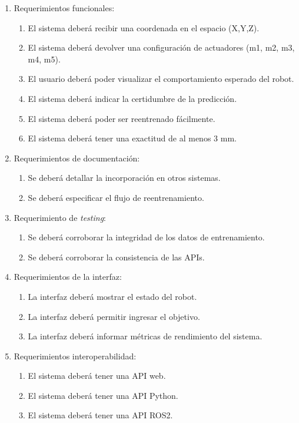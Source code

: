\documentclass[
11pt, %
]{charter}
\begin{document}
\begin{enumerate}
	\item Requerimientos funcionales:
		\begin{enumerate}
			\item El sistema deberá recibir una coordenada en el espacio (X,Y,Z).
			\item El sistema deberá devolver una configuración de actuadores (m1, m2, m3, m4, m5).
			\item El usuario deberá poder visualizar el comportamiento esperado del robot.
			\item El sistema deberá indicar la certidumbre de la predicción.
			\item El sistema deberá poder ser reentrenado fácilmente.
			\item El sistema deberá tener una exactitud de al menos 3 mm.
		\end{enumerate}
	\item Requerimientos de documentación:
		\begin{enumerate}
			\item Se deberá detallar la incorporación en otros sistemas.
			\item Se deberá especificar el flujo de reentrenamiento.
		\end{enumerate}
	\item Requerimiento de \textit{testing}:
		\begin{enumerate}
			\item Se deberá corroborar la integridad de los datos de entrenamiento.
			\item Se deberá corroborar la consistencia de las APIs.
		\end{enumerate}
	\item Requerimientos de la interfaz:
		\begin{enumerate}
			\item La interfaz deberá mostrar el estado del robot.
			\item La interfaz deberá permitir ingresar el objetivo.
			\item La interfaz deberá informar métricas de rendimiento del sistema.
		\end{enumerate}
	\item Requerimientos interoperabilidad:
		\begin{enumerate}
			\item El sistema deberá tener una API web.
			\item El sistema deberá tener una API Python.
			\item El sistema deberá tener una API ROS2.
		\end{enumerate}
\end{enumerate}
\end{document}
